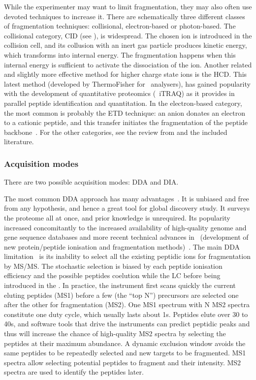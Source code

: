 While the experimenter may want to limit fragmentation,
they may also often use devoted techniques to increase it.
There are schematically three different classes of fragmentation techniques:
collisional, electron-based or photon-based.
The collisional category, \gls{CID} (see ),
is widespread.
The chosen ion is introduced in the collision cell,
and its collusion with an inert gas particle produces kinetic energy,
which transforms into internal energy.
The fragmentation happens when this internal energy is sufficient to activate
the dissociation of the ion.
Another related and slightly more effective method
for higher charge state ions is the \acrfull{HCD}.
This latest method (developed by ThermoFisher for \orbi\ analysers),
has gained popularity with the development of quantitative proteomics
(\eg\ \gls{iTRAQ})
as it provides in parallel peptide identification and quantitation.
In the electron-based category,
the most common is probably the \acrfull{ETD} technique:
an anion donates an electron to a cationic peptide,
and this transfer initiates
the fragmentation of the peptide backbone~.
For the other categories,
see the review from \citet{Zhang2014} and the included literature.\mybr\

\subsubsection{Acquisition modes}
There are two possible acquisition modes: \gls{DDA} and \gls{DIA}.\mybr\

The most common \gls{DDA} approach has many advantages~.
It is unbiased and free from any hypothesis,
and hence a great tool for global discovery study.
It surveys the proteome all at once,
and prior knowledge is unrequired.
Its popularity increased concomitantly to the increased availability of
high-quality genome and gene sequence databases
and more recent technical advances in \ms\
(development of new protein/peptide ionisation
and fragmentation methods)~.
The main \gls{DDA} limitation~\mycite{Guillaumot2017-ba} is its inability
to select all the existing peptidic ions for fragmentation by \gls{MS/MS}.
The stochastic selection is biased by
each peptide ionisation efficiency
and the possible peptides coelution
while the \gls{LC} before being introduced in the \ms.
In practice, the instrument first scans quickly the current eluting peptides (MS1)
before a few (the ``top N'') precursors are selected
one after the other for fragmentation (MS2).
One MS1 spectrum with N MS2 spectra constitute one duty cycle,
which usually lasts about 1s.
Peptides elute over 30 to 40s,
and software tools that drive the instruments can predict peptidic peaks
and thus will increase the chance of high-quality MS2 spectra
by selecting the peptides at their maximum abundance.
A dynamic exclusion window avoids the same peptides to be repeatedly selected and
new targets to be fragmented.
MS1 spectra allow selecting potential peptides to fragment and their intensity.
MS2 spectra are used to identify the peptides later.\mybr\

